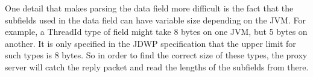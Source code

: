 \documentclass[..thesis.tex]{subfiles}
\begin{document}
One detail that makes parsing the data field more difficult is the fact that the subfields used in the data field can have variable size depending on the JVM.
For example, a ThreadId type of field might take 8 bytes on one JVM, but 5 bytes on another.
It is only specified in the JDWP specification that the upper limit for such types is 8 bytes.
So in order to find the correct size of these types, the proxy server will catch the  reply packet and read the lengths of the subfields from there.
\end{document}
